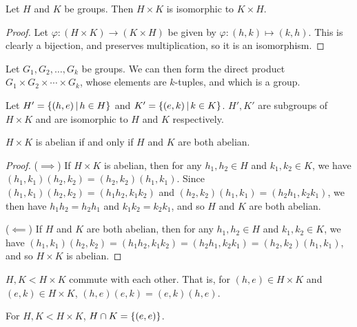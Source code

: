 \begin{prop}
    Let $H$ and $K$ be groups. Then $H \times K$ is isomorphic to $K \times H$.
\end{prop}

\begin{proof}
    Let $\varphi: (H \times K) \to (K \times H)$ be given by $\varphi: (h, k) \mapsto (k, h)$. This is clearly a bijection, and preserves multiplication, so it is an isomorphism.
\end{proof}

\begin{prop}
    Let $G_1, G_2, \ldots, G_k$ be groups. We can then form the direct product $G_1 \times G_2 \times \cdots \times G_k$, whose elements are $k$-tuples, and which is a group.
\end{prop}

\begin{prop}
    Let $H' = \left\{(h, e) \,\middle|\, h \in H\right\}$ and $K' = \left\{(e, k) \,\middle|\, k \in K\right\}$. $H', K'$ are subgroups of $H \times K$ and are isomorphic to $H$ and $K$ respectively.
\end{prop}

\begin{prop}
    $H \times K$ is abelian if and only if $H$ and $K$ are both abelian.
\end{prop}

\begin{proof}\proofbreak
    ($\implies$) If $H \times K$ is abelian, then for any $h_1,h_2 \in H$ and $k_1,k_2 \in K$, we have $(h_1,k_1)(h_2,k_2) = (h_2,k_2)(h_1,k_1)$. Since $(h_1,k_1)(h_2,k_2) = (h_1h_2,k_1k_2)$ and $(h_2,k_2)(h_1,k_1) = (h_2h_1,k_2k_1)$, we then have $h_1h_2 = h_2h_1$ and $k_1k_2 = k_2k_1$, and so $H$ and $K$ are both abelian.

    ($\impliedby$) If $H$ and $K$ are both abelian, then for any $h_1,h_2 \in H$ and $k_1,k_2 \in K$, we have $(h_1,k_1)(h_2,k_2) = (h_1h_2,k_1k_2) = (h_2h_1,k_2k_1) = (h_2,k_2)(h_1,k_1)$, and so $H \times K$ is abelian.
\end{proof}

\begin{prop}
    $H, K < H \times K$ commute with each other. That is, for $(h, e) \in H \times K$ and $(e, k) \in H \times K$, $(h,e)(e, k) = (e, k)(h,e)$.
\end{prop}

\begin{prop}
    For $H, K < H \times K$, $H \cap K = \{(e, e)\}$.
\end{prop}

